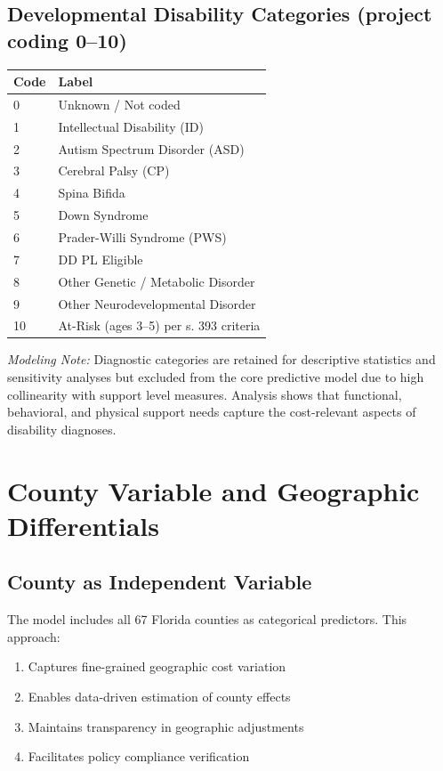 \subsection{Developmental Disability Categories (project coding 0--10)}

\begin{center}
\begin{tabular}{|l|l|}
\hline
\textbf{Code} & \textbf{Label} \\
\hline
0  & Unknown / Not coded \\
1  & Intellectual Disability (ID) \\
2  & Autism Spectrum Disorder (ASD) \\
3  & Cerebral Palsy (CP) \\
4  & Spina Bifida \\
5  & Down Syndrome \\
6  & Prader-Willi Syndrome (PWS) \\
7  & DD PL Eligible \\
8  & Other Genetic / Metabolic Disorder \\
9  & Other Neurodevelopmental Disorder \\
10 & At-Risk (ages 3--5) per s. 393 criteria \\
\hline
\end{tabular}
\end{center}

\textit{Modeling Note:} Diagnostic categories are retained for descriptive statistics and sensitivity analyses but excluded from the core predictive model due to high collinearity with support level measures. Analysis shows that functional, behavioral, and physical support needs capture the cost-relevant aspects of disability diagnoses.

\section{County Variable and Geographic Differentials}

\subsection{County as Independent Variable}

The model includes all 67 Florida counties as categorical predictors. This approach:
\begin{enumerate}
    \item Captures fine-grained geographic cost variation
    \item Enables data-driven estimation of county effects
    \item Maintains transparency in geographic adjustments
    \item Facilitates policy compliance verification
\end{enumerate}

